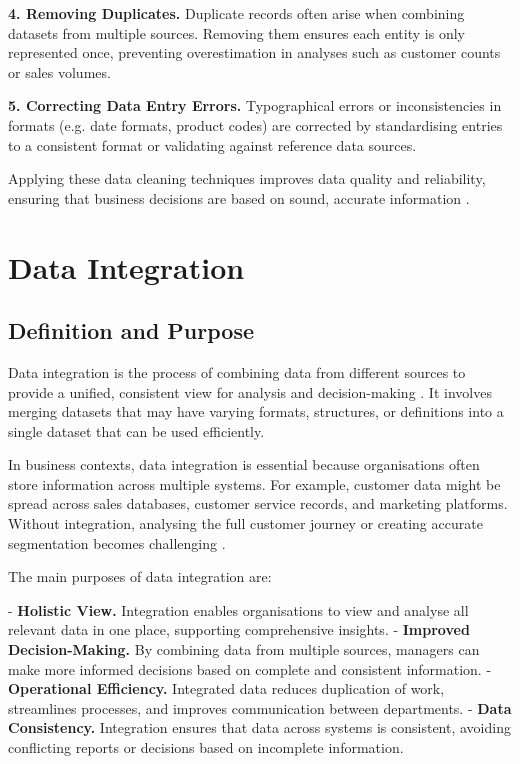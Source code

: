 \textbf{4. Removing Duplicates.}  
Duplicate records often arise when combining datasets from multiple sources. Removing them ensures each entity is only represented once, preventing overestimation in analyses such as customer counts or sales volumes.

\textbf{5. Correcting Data Entry Errors.}  
Typographical errors or inconsistencies in formats (e.g. date formats, product codes) are corrected by standardising entries to a consistent format or validating against reference data sources.

Applying these data cleaning techniques improves data quality and reliability, ensuring that business decisions are based on sound, accurate information \cite{oliveira2005data}.


\section{Data Integration}

\subsection{Definition and Purpose}

Data integration is the process of combining data from different sources to provide a unified, consistent view for analysis and decision-making \cite{lenzerini2002data}. It involves merging datasets that may have varying formats, structures, or definitions into a single dataset that can be used efficiently.

In business contexts, data integration is essential because organisations often store information across multiple systems. For example, customer data might be spread across sales databases, customer service records, and marketing platforms. Without integration, analysing the full customer journey or creating accurate segmentation becomes challenging \cite{doan2012principles}.

The main purposes of data integration are:

- \textbf{Holistic View.} Integration enables organisations to view and analyse all relevant data in one place, supporting comprehensive insights.
- \textbf{Improved Decision-Making.} By combining data from multiple sources, managers can make more informed decisions based on complete and consistent information.
- \textbf{Operational Efficiency.} Integrated data reduces duplication of work, streamlines processes, and improves communication between departments.
- \textbf{Data Consistency.} Integration ensures that data across systems is consistent, avoiding conflicting reports or decisions based on incomplete information.

